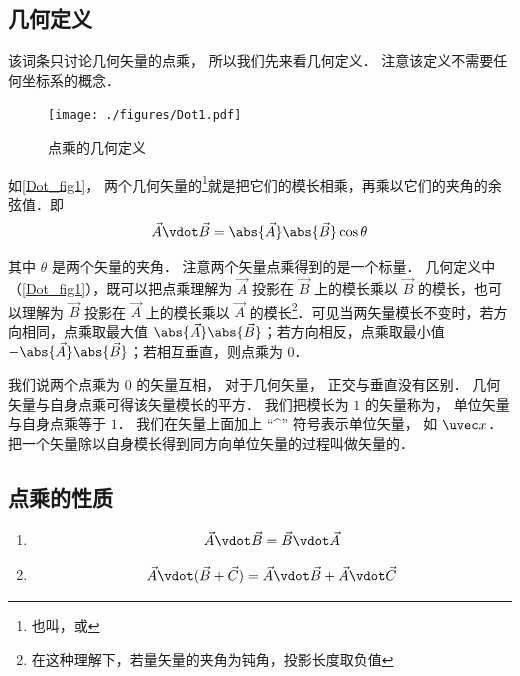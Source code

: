 

\subsection{几何定义}
该词条只讨论几何矢量的点乘， 所以我们先来看几何定义． 注意该定义不需要任何坐标系的概念．
\begin{figure}[th]
\centering
\texttt{[image: ./figures/Dot1.pdf]}
\caption{点乘的几何定义}\label{Dot_fig1}
\end{figure}

如\autoref{Dot_fig1}， 两个几何矢量的\footnote{也叫，或}就是把它们的模长相乘，再乘以它们的夹角的余弦值．即
\begin{equation}\label{Dot_eq1}
\vec A \vdot \vec B = \abs{\vec A} \abs{\vec B} \cos\theta 
\end{equation}

其中 $\theta$ 是两个矢量的夹角． 注意两个矢量点乘得到的是一个标量． 几何定义中（\autoref{Dot_fig1}），既可以把点乘理解为 $\vec A$ 投影在 $\vec B$ 上的模长乘以 $\vec B$ 的模长，也可以理解为 $\vec B$ 投影在 $\vec A$ 上的模长乘以 $\vec A$ 的模长\footnote{在这种理解下，若量矢量的夹角为钝角，投影长度取负值}．可见当两矢量模长不变时，若方向相同，点乘取最大值 $\abs{\vec A}\abs{\vec B}$；若方向相反，点乘取最小值 $-\abs{\vec A}\abs{\vec B}$；若相互垂直，则点乘为 0．

我们说两个点乘为 0 的矢量互相， 对于几何矢量， 正交与垂直没有区别． 几何矢量与自身点乘可得该矢量模长的平方． 我们把模长为 $1$ 的矢量称为， 单位矢量与自身点乘等于 $1$． 我们在矢量上面加上 “\^{}” 符号表示单位矢量， 如 $\uvec x$． 把一个矢量除以自身模长得到同方向单位矢量的过程叫做矢量的．

\subsection{点乘的性质}

\begin{enumerate}
\item {}
\begin{equation}
\vec A \vdot \vec B = \vec B \vdot \vec A
\end{equation}

\item {}
\begin{equation}\label{Dot_eq3}
\vec A \vdot (\vec B + \vec C) = \vec A \vdot \vec B + \vec A \vdot \vec C
\end{equation}
\end{enumerate}

